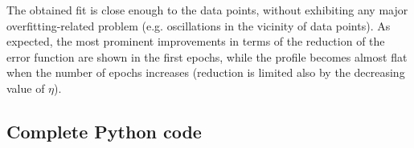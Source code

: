 \documentclass[letterpaper,headings=standardclasses]{scrartcl}
\begin{document}
The obtained fit is close enough to the data points, without exhibiting any major overfitting-related problem (e.g. oscillations in the vicinity of data points). As expected, the most prominent improvements in terms of the reduction of the error function are shown in the first epochs, while the profile becomes almost flat when the number of epochs increases (reduction is limited also by the decreasing value of $\eta$).

\subsection{Complete Python code}


\end{document}
